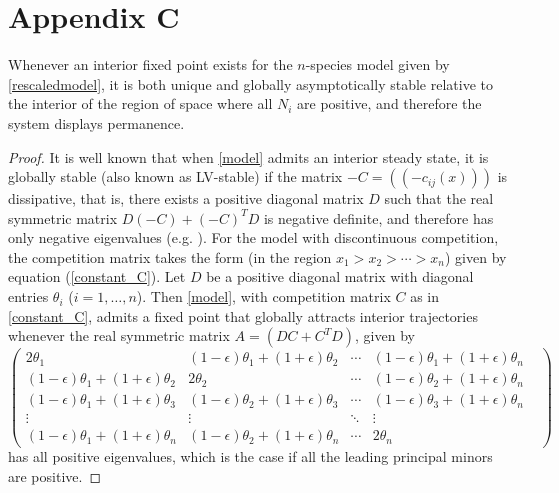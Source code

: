 \section*{Appendix C}
\begin{lem}Whenever an interior fixed point exists for the $n$-species model given by \eqref{rescaledmodel}, it is both unique and globally asymptotically stable relative to the interior of the region of space where all $N_i$ are positive, and therefore the system displays permanence.\end{lem}
\begin{proof} It is well known that when \eqref{model} admits an interior steady state, it is globally stable (also known as LV-stable) if the  matrix $-C=((-c_{ij}(x)))$ is dissipative, that is, there exists a positive diagonal matrix $D$ such that the real symmetric matrix $D(-C)+(-C)^TD$ is negative definite, and therefore has only negative eigenvalues (e.g. \cite{hofandsig}). For the model with discontinuous competition,  the competition matrix takes the form (in the region $x_1>x_2>\cdots > x_n$) given by equation (\ref{constant_C}). 
Let $D$ be a positive diagonal matrix with diagonal entries $\theta_i$ ($i=1,\ldots,n$).
Then \eqref{model}, with competition matrix $C$ as in \eqref{constant_C}, admits a  fixed point that globally attracts interior trajectories whenever the real symmetric matrix $A=(DC+C^TD)$, given by
\[
\label{posdef}
\begin{pmatrix}
2\theta_1&(1-\epsilon)\theta_1+(1+\epsilon)\theta_2&\cdots&(1-\epsilon)\theta_1+(1+\epsilon)\theta_n\\
(1-\epsilon)\theta_1+(1+\epsilon)\theta_2&2\theta_2& \cdots&(1-\epsilon)\theta_2+(1+\epsilon)\theta_n\\
(1-\epsilon)\theta_1+(1+\epsilon)\theta_3&(1-\epsilon)\theta_2+(1+\epsilon)\theta_3&\cdots&(1-\epsilon)\theta_3+(1+\epsilon)\theta_n\\
\vdots&\vdots&\ddots&\vdots&\\
(1-\epsilon)\theta_1+(1+\epsilon)\theta_n&(1-\epsilon)\theta_2+(1+\epsilon)\theta_n&\cdots&2\theta_n
\end{pmatrix} 
\]
has all positive eigenvalues, which is the case if all the leading principal minors are positive.


\end{proof}
